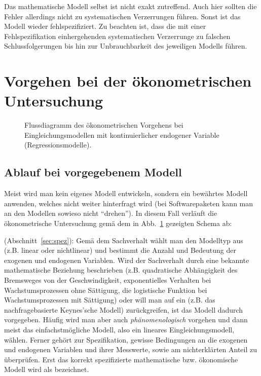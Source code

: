 \item Das mathematische Modell selbst
ist nicht exakt zutreffend. Auch hier sollten die Fehler allerdings
nicht zu systematischen Verzerrungen f\"uhren. Sonst ist das Modell
wieder fehlspezifiziert.
\ei
Zu beachten ist, dass die mit einer Fehlspezifikation einhergehenden
systematischen Verzerrunge 
zu falschen Schlussfolgerungen bis hin zur Unbrauchbarkeit des
jeweiligen Modells f\"uhren.



\section{\label{sec:stetigAblauf}Vorgehen bei der \"okonometrischen Untersuchung}

\begin{figure}
\caption{\label{fig:flussdiagRegr}Flussdiagramm des \"okonometrischen
Vorgehens bei Eingleichungsmodellen mit kontinuierlicher endogener
Variable (Regressionsmodelle).}
\end{figure}

\subsection{Ablauf bei vorgegebenem Modell}

Meist wird man kein eigenes Modell entwickeln, sondern 
ein bew\"ahrtes Modell anwenden, welches nicht weiter hinterfragt wird
(bei Softwarepaketen kann man an den Modellen sowieso nicht
``drehen''). In diesem Fall verl\"auft die \"okonometrische
Untersuchung gem\"a\3 dem in Abb.~\ref{fig:flussdiagRegr} gezeigten
Schema ab:

\benum
\item {} (Abschnitt~\ref{sec:spez}): Gem\"a\3 dem
Sachverhalt w\"ahlt man den 
Modelltyp aus (z.B. linear oder nichtlinear) und bestimmt die Anzahl
und Bedeutung der exogenen und endogenen Variablen. Wird der
Sachverhalt durch eine
bekannte mathematische Beziehung beschrieben (z.B. quadratische
Abh\"angigkeit des Bremsweges von der Geschwindigkeit, exponentielles
Verhalten bei Wachstumsprozessen ohne S\"attigung, die logistische
Funktion bei Wachstumsprozessen mit S\"attigung) oder will man auf ein
 (z.B. das nachfragebasierte Keynes'sche
Modell) zur\"uckgreifen, ist das Modell
dadurch vorgegeben. H\"aufig wird man aber auch \emph{ph\"anomenologisch}
vorgehen und dann meist das einfachstm\"ogliche Modell, also ein lineares
Eingleichungsmodell, w\"ahlen.
Ferner geh\"ort zur Spezifikation, gewisse Bedingungen an die exogenen
und endogenen Variablen und ihrer Messwerte, sowie am nichterkl\"arten
Anteil zu \"uberpr\"ufen. Erst das korrekt spezifizierte mathematische bzw.
\"okonomische Modell wird als  bezeichnet.

